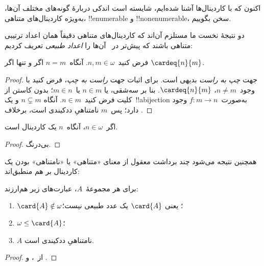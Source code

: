 \documentclass[../../../include/open-logic-section]{subfiles}
\begin{document}

اکنون که با کاردینال‌ها آشنا شده‌ایم، شایسته است اندکی دربارهٔ گونه‌های
مختلف آن‌ها، به‌ویژه کاردینال‌های متناهی، !!{enumerable} و
!!{nonenumerable}، سخن بگوییم.

دو نتیجهٔ نخست ما مستلزم آن‌اند که کاردینال‌های متناهی دقیقاً همان اعداد
ترتیبی متناهی باشند که پیش‌تر در~
آن‌ها را \emph{اعداد طبیعی} تعریف کردیم:

\begin{prop}
فرض کنید~$n,m\in\omega$. آنگاه~$n=m$ اگر و تنها اگر
$\cardeq{n}{m}$.
\end{prop}

\begin{proof}
جهت \emph{چپ به راست} بدیهی است. برای اثبات جهت \emph{راست به چپ}،
فرض کنید با وجود~$n\neq m$، $\cardeq{n}{m}$. بنا بر سه‌شقی، یا
$n\in m$ یا~$m\in n$؛ بدون کاستن از کلیت فرض کنید~$n\in m$. آنگاه
$n\subsetneq m$ و یک~!!a{bijection} به‌صورت~$f\colon m\to n$ وجود
دارد؛ پس~$m$ نامتناهیِ ددکیندی است، برخلاف
.
\end{proof}

\begin{cor}
اگر~$n\in\omega$، آنگاه~$n$ یک کاردینال است.
\end{cor}

\begin{proof}
بی‌درنگ.
\end{proof}
\noindent
همچنین نتیجه می‌شود چند برداشت معقول از معنای «متناهی» یا «نامتناهی»
بودن یک کاردینال بر هم منطبق‌اند:
\begin{thm}
برای هر مجموعهٔ~$A$، عبارت‌های زیر هم‌ارزند:
\begin{enumerate}
	\item{} $\card{A}\notin\omega$؛ یعنی
	$\card{A}$ یک عدد طبیعی نیست؛
	\item{} $\omega\leq\card{A}$؛
	\item{} $A$ نامتناهیِ ددکیندی است.
\end{enumerate}
\end{thm}

\begin{proof}
از~،
 و
.
\end{proof}
\end{document}
